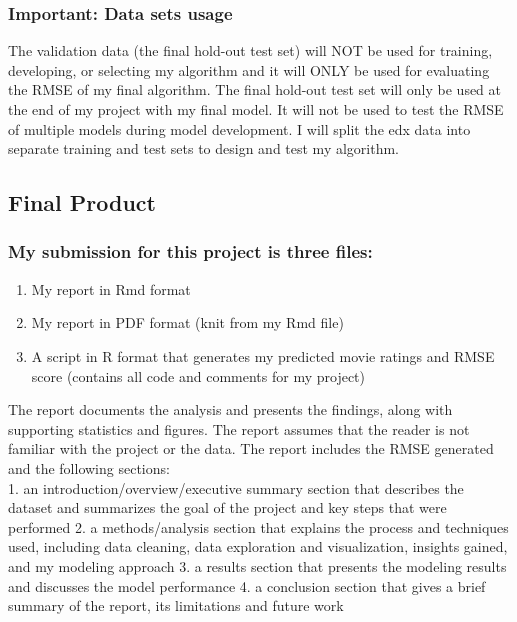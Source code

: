 \documentclass[
]{article}
\providecommand{\tightlist}{%
  \setlength{\itemsep}{0pt}\setlength{\parskip}{0pt}}
\begin{document}
\hypertarget{important-data-sets-usage}{%
\subsubsection{Important: Data sets
usage}\label{important-data-sets-usage}}

The validation data (the final hold-out test set) will NOT be used for
training, developing, or selecting my algorithm and it will ONLY be used
for evaluating the RMSE of my final algorithm. The final hold-out test
set will only be used at the end of my project with my final model. It
will not be used to test the RMSE of multiple models during model
development. I will split the edx data into separate training and test
sets to design and test my algorithm.

\hypertarget{final-product}{%
\subsection{Final Product}\label{final-product}}

\hypertarget{my-submission-for-this-project-is-three-files}{%
\subsubsection{My submission for this project is three
files:}\label{my-submission-for-this-project-is-three-files}}

\begin{enumerate}
\def\labelenumi{\arabic{enumi}.}
\tightlist
\item
  My report in Rmd format
\item
  My report in PDF format (knit from my Rmd file)
\item
  A script in R format that generates my predicted movie ratings and
  RMSE score (contains all code and comments for my project)
\end{enumerate}

The report documents the analysis and presents the findings, along with
supporting statistics and figures. The report assumes that the reader is
not familiar with the project or the data. The report includes the RMSE
generated and the following sections:\\
1. an introduction/overview/executive summary section that describes the
dataset and summarizes the goal of the project and key steps that were
performed 2. a methods/analysis section that explains the process and
techniques used, including data cleaning, data exploration and
visualization, insights gained, and my modeling approach 3. a results
section that presents the modeling results and discusses the model
performance 4. a conclusion section that gives a brief summary of the
report, its limitations and future work
\end{document}
